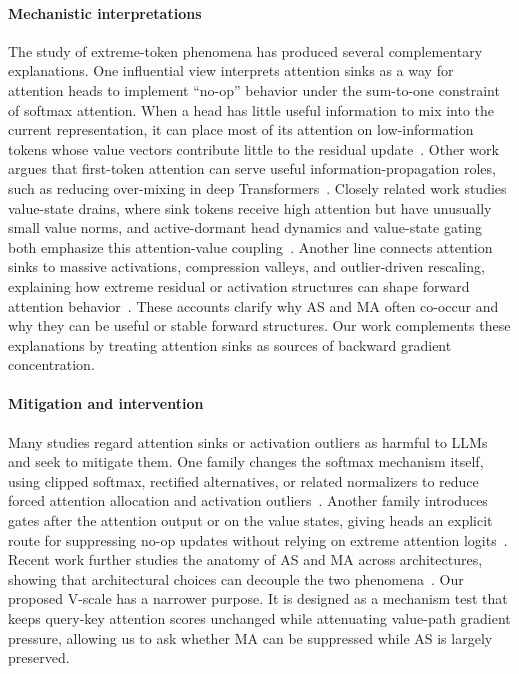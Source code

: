 \documentclass{article}
\theoremstyle{plain}
\theoremstyle{definition}
\theoremstyle{remark}
\begin{document}
\paragraph{Mechanistic interpretations}
The study of extreme-token phenomena has produced several complementary explanations. 
One influential view interprets attention sinks as a way for attention heads to implement ``no-op'' behavior under the sum-to-one constraint of softmax attention. When a head has little useful information to mix into the current representation, it can place most of its attention on low-information tokens whose value vectors contribute little to the residual update~\cite{bondarenko2023quantizable,gu2025when}. 
Other work argues that first-token attention can serve useful information-propagation roles, such as reducing over-mixing in deep Transformers~\cite{barbero2025why}. 
Closely related work studies value-state drains, where sink tokens receive high attention but have unusually small value norms, and active-dormant head dynamics and value-state gating both emphasize this attention-value coupling~\cite{guo2025activedormant,bu2025valuestategated}. 
Another line connects attention sinks to massive activations, compression valleys, and outlier-driven rescaling, explaining how extreme residual or activation structures can shape forward attention behavior~\cite{sun2024massive,kaul2025from,queipo-de-llano2026attention,sun2026anatomy,qiu2026unified}. 
These accounts clarify why AS and MA often co-occur and why they can be useful or stable forward structures.
Our work complements these explanations by treating attention sinks as sources of backward gradient concentration.

\paragraph{Mitigation and intervention}
Many studies regard attention sinks or activation outliers as harmful to LLMs and seek to mitigate them.
One family changes the softmax mechanism itself, using clipped softmax, rectified alternatives, or related normalizers to reduce forced attention allocation and activation outliers~\cite{bondarenko2023quantizable,miller2023attention,kaul2025from,zuhri2025softpick}. 
Another family introduces gates after the attention output or on the value states, giving heads an explicit route for suppressing no-op updates without relying on extreme attention logits~\cite{qiu2025gated,bu2025valuestategated}. 
Recent work further studies the anatomy of AS and MA across architectures, showing that architectural choices can decouple the two phenomena~\cite{sun2026anatomy}. 
Our proposed V-scale has a narrower purpose. It is designed as a mechanism test that keeps query-key attention scores unchanged while attenuating value-path gradient pressure, allowing us to ask whether MA can be suppressed while AS is largely preserved.
\end{document}
